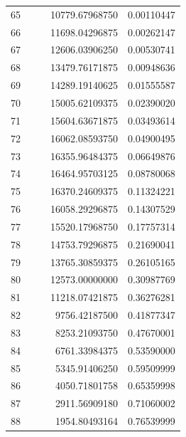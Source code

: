 \begin{center}
\begin{xtabular}{|r||rr||rr|}
65 &               &              &    10779.67968750 & 0.00110447 \\
66 &               &              &    11698.04296875 & 0.00262147 \\
67 &               &              &    12606.03906250 & 0.00530741 \\
68 &               &              &    13479.76171875 & 0.00948636 \\
69 &               &              &    14289.19140625 & 0.01555587 \\
70 &               &              &    15005.62109375 & 0.02390020 \\
71 &               &              &    15604.63671875 & 0.03493614 \\
72 &               &              &    16062.08593750 & 0.04900495 \\
73 &               &              &    16355.96484375 & 0.06649876 \\
74 &               &              &    16464.95703125 & 0.08780068 \\
75 &               &              &    16370.24609375 & 0.11324221 \\
76 &               &              &    16058.29296875 & 0.14307529 \\
77 &               &              &    15520.17968750 & 0.17757314 \\
78 &               &              &    14753.79296875 & 0.21690041 \\
79 &               &              &    13765.30859375 & 0.26105165 \\
80 &               &              &    12573.00000000 & 0.30987769 \\
81 &               &              &    11218.07421875 & 0.36276281 \\
82 &               &              &     9756.42187500 & 0.41877347 \\
83 &               &              &     8253.21093750 & 0.47670001 \\
84 &               &              &     6761.33984375 & 0.53590000 \\
85 &               &              &     5345.91406250 & 0.59509999 \\
86 &               &              &     4050.71801758 & 0.65359998 \\
87 &               &              &     2911.56909180 & 0.71060002 \\
88 &               &              &     1954.80493164 & 0.76539999 \\

\end{xtabular}
\end{center}

